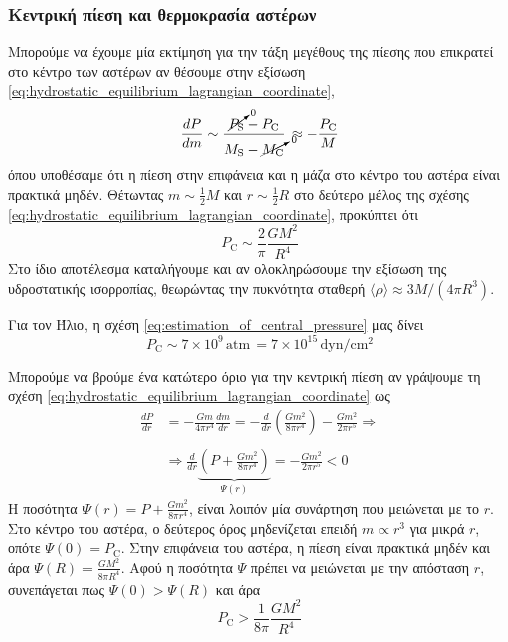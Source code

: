 \subsubsection{Κεντρική πίεση και θερμοκρασία αστέρων}
Μπορούμε να έχουμε μία εκτίμηση για την τάξη μεγέθους της πίεσης που επικρατεί στο κέντρο των αστέρων αν θέσουμε στην εξίσωση \eqref{eq:hydrostatic_equilibrium_lagrangian_coordinate},
        \begin{equation}
            \frac{dP}{dm} \sim \frac{\cancelto{0}{P_{\text{S}}} - P_{\text{C}}}{M_{\text{S}} - \cancelto{0}{M_{\text{C}}}} \,\approx - \frac{P_{\text{C}}}{M}
        \end{equation}
        όπου υποθέσαμε ότι η πίεση στην επιφάνεια και η μάζα στο κέντρο του αστέρα είναι πρακτικά μηδέν. Θέτωντας $m \sim \frac{1}{2} M $ και $r \sim \frac{1}{2} R$ στο δεύτερο μέλος της σχέσης \eqref{eq:hydrostatic_equilibrium_lagrangian_coordinate}, προκύπτει ότι 
        \begin{equation}
            \label{eq:estimation_of_central_pressure}
            \boxed{P_{\text{C}} \sim \frac{2}{\pi} \frac{G M^2}{R^4}}
        \end{equation}
        Στο ίδιο αποτέλεσμα καταλήγουμε και αν ολοκληρώσουμε την εξίσωση της υδροστατικής ισορροπίας, θεωρώντας την πυκνότητα σταθερή $\langle \rho \rangle \approx 3M/(4\pi R^3)$.
        
        Για τον Ήλιο, η σχέση \eqref{eq:estimation_of_central_pressure} μας δίνει $$P_{\text{C}} \sim 7 \times 10^9 \,\text{atm} \,= 7 \times 10^{15} \,\text{dyn/cm$^2$}$$
        
        Μπορούμε να βρούμε ένα κατώτερο όριο για την κεντρική πίεση αν γράψουμε τη σχέση \eqref{eq:hydrostatic_equilibrium_lagrangian_coordinate} ως
        \begin{align*}
            \frac{dP}{dr} &= - \frac{Gm}{4\pi r^4} \frac{dm}{dr} = - \frac{d}{dr} \left( \frac{Gm^2}{8\pi r^4} \right) - \frac{Gm^2}{2\pi r^5} \Rightarrow \\\\
            &\Rightarrow \frac{d}{dr} \underbrace{\left( P + \frac{G m^2}{8 \pi r^4} \right)}_{\Psi(r)} = - \frac{G m^2}{2\pi r^5} < 0
        \end{align*}
        Η ποσότητα $\displaystyle \Psi(r) = P + \frac{G m^2}{8 \pi r^4}$, είναι λοιπόν μία συνάρτηση που μειώνεται με το $r$. Στο κέντρο του αστέρα, ο δεύτερος όρος μηδενίζεται επειδή $m \propto r^3$ για μικρά $r$, οπότε $\Psi(0) = P_{\text{C}}$. Στην επιφάνεια του αστέρα, η πίεση είναι πρακτικά μηδέν και άρα $\displaystyle \Psi(R) = \frac{GM^2}{8\pi R^4}$. Αφού η ποσότητα $\Psi$ πρέπει να μειώνεται με την απόσταση $r$, συνεπάγεται πως $\Psi(0) > \Psi(R)$ και άρα
        \begin{equation}
            \label{eq:lower_limit_of_central_pressure_for_stars_in_HE}
            P_{\text{C}} > \frac{1}{8\pi} \frac{GM^2}{R^4}
        \end{equation}
        
